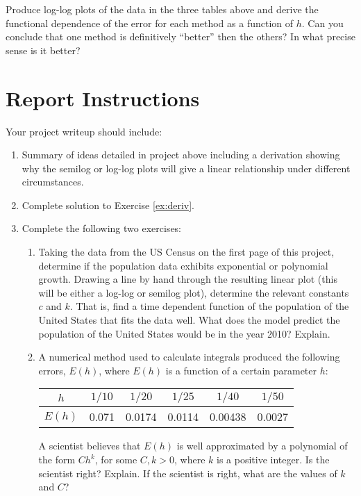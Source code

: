 Produce log-log plots of the data in the three tables above and
derive the functional dependence of the error for each method as a
function of $h$.  Can you conclude that one method is definitively
``better'' then the others?  In what precise sense is it better?
\label{ex:deriv}
\noproblemfont

\section{Report Instructions}

Your project writeup should include:
\begin{enumerate}
\item Summary of ideas detailed in project above including a
  derivation showing why the semilog or log-log plots will give a
  linear relationship under different circumstances.

\item Complete solution to Exercise \ref{ex:deriv}.
\item Complete the following two exercises:

  \begin{enumerate}
  \item Taking the data from the US Census on the first page of this
    project, determine if the population data exhibits exponential or
    polynomial growth.  Drawing a line by hand through the resulting
    linear plot (this will be either a log-log or semilog plot),
    determine the relevant constants $c$ and $k$.  That is, find a
    time dependent function of the population of the United States
    that fits the data well.  What does the model predict the
    population of the United States would be in the year 2010?
    Explain.

  \item A numerical method used to calculate integrals produced the
    following errors, $E(h)$, where $E(h)$ is a function of a certain
    parameter $h$:

    \medskip

    \begin{center}
      \begin{tabular}{|c|c|c|c|c|c|}\hline
        $h$ & $1/10$ & $1/20$& $1/25$& $1/40$ & $1/50$\\\hline
        $E(h)$ & 0.071 & 0.0174 & 0.0114 &  0.00438 & 0.0027 \\\hline
      \end{tabular}
    \end{center}
    \medskip

    A scientist believes that $E(h)$ is well approximated by a
    polynomial of the form $C h^k$, for some $C,k>0$, where $k$ is a
    positive integer.  Is the scientist right?  Explain.  If the
    scientist is right, what are the values of $k$ and $C$?

  \end{enumerate}
\end{enumerate}

